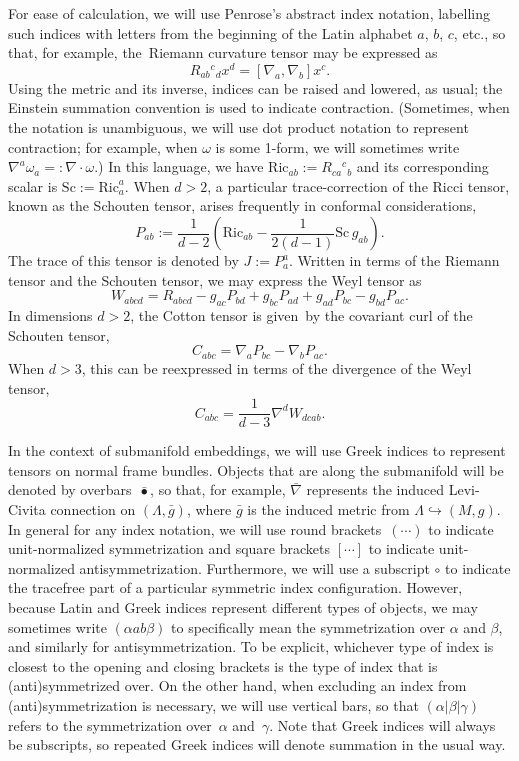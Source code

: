 \documentclass[10pt,a4paper]{article}
\numberwithin{equation}{section}
\renewcommand{\=}{\stackrel \Lambda =}
\begin{document}
For ease of calculation, we will use Penrose's abstract index notation, labelling such indices with letters from the beginning of the Latin alphabet $a$, $b$, $c$, etc., so that, for example, the~Riemann curvature tensor may be expressed as
\[
R_{ab}{}^c{}_d x^d = [\nabla_a, \nabla_b] x^c .
\]
Using the metric and its inverse, indices can be raised and lowered, as usual; the Einstein summation convention is used to indicate contraction. (Sometimes, when the notation is unambiguous, we will use dot product notation to represent contraction; for example, when $\omega$ is some 1-form, we will sometimes write $\nabla^a \omega_a =: \nabla \cdot \omega$.) In this language, we have $\mathrm{Ric}_{ab} := R_{ca}{}^c{}_b$ and its corresponding scalar is $\mathrm{Sc} := \mathrm{Ric}_a^a$. When $d > 2$, a particular trace-correction of the Ricci tensor, known as the Schouten tensor, arises frequently in conformal considerations,
\[
P_{ab} := \frac{1}{d-2} \left(\mathrm{Ric}_{ab} - \frac{1}{2(d-1)} \mathrm{Sc}\, g_{ab} \right) .
\]
The trace of this tensor is denoted by $J := P_a^a$. Written in terms of the Riemann tensor and the Schouten tensor, we may express the Weyl tensor as
\[
W_{abcd} = R_{abcd} - g_{ac} P_{bd} + g_{bc} P_{ad} + g_{ad} P_{bc} - g_{bd} P_{ac} .
\]
In dimensions $d > 2$, the Cotton tensor is given~by the covariant curl of the Schouten tensor,
\[
C_{abc} = \nabla_a P_{bc} - \nabla_b P_{ac} .
\]
When $d > 3$, this can be reexpressed in terms of the divergence of the Weyl tensor,
\[
C_{abc} = \frac{1}{d-3} \nabla^d W_{dcab} .
\]

In the context of submanifold embeddings, we will use Greek indices to represent tensors on normal frame bundles. Objects that are along the submanifold will be denoted by overbars~$\bar{\bullet}$, so that, for example, $\bar{\nabla}$ represents the induced Levi-Civita connection on $(\Lambda,\bar{g})$, where $\bar{g}$ is the induced metric from $\Lambda \hookrightarrow (M,g)$. In general for any index notation, we will use round brackets~$(\cdots)$ to indicate unit-normalized symmetrization and square brackets $[\cdots]$ to indicate unit-normalized antisymmetrization. Furthermore, we will use a subscript $\circ$ to indicate the tracefree part of a particular symmetric index configuration. However, because Latin and Greek indices represent different types of objects, we may sometimes write $(\alpha a b \beta)$ to specifically mean the symmetrization over $\alpha$ and $\beta$, and similarly for antisymmetrization. To be explicit, whichever type of index is closest to the opening and closing brackets is the type of index that is (anti)symmetrized over. On the other hand, when excluding an index from (anti)symmetrization is necessary, we will use vertical bars, so that $(\alpha | \beta | \gamma)$ refers to the symmetrization over~$\alpha$ and~$\gamma$. Note that Greek indices will always be subscripts, so repeated Greek indices will denote summation in the usual way.
\end{document}
